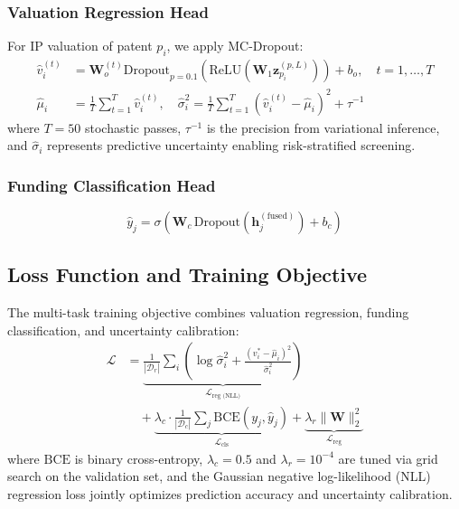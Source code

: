 \documentclass[journal]{IEEEtran}
\begin{document}
\subsubsection{Valuation Regression Head}

For IP valuation of patent $p_i$, we apply MC-Dropout:
\begin{align}
    \hat{v}_i^{(t)} &= \mathbf{W}_o^{(t)} \text{Dropout}_{p=0.1}(\text{ReLU}(\mathbf{W}_1 \mathbf{z}_{p_i}^{(p,L)})) + b_o, \quad t = 1,\ldots,T \label{eq:mc_fwd} \\
    \hat{\mu}_i &= \frac{1}{T}\sum_{t=1}^T \hat{v}_i^{(t)}, \quad \hat{\sigma}_i^2 = \frac{1}{T}\sum_{t=1}^T (\hat{v}_i^{(t)} - \hat{\mu}_i)^2 + \tau^{-1} \label{eq:mc_stats}
\end{align}
where $T=50$ stochastic passes, $\tau^{-1}$ is the precision from variational inference, and $\hat{\sigma}_i$ represents predictive uncertainty enabling risk-stratified screening.

\subsubsection{Funding Classification Head}

\begin{equation}
    \hat{y}_j = \sigma\!\left(\mathbf{W}_c \, \text{Dropout}(\mathbf{h}_j^{(\text{fused})}) + b_c\right)
    \label{eq:funding_head}
\end{equation}

\subsection{Loss Function and Training Objective}

The multi-task training objective combines valuation regression, funding classification, and uncertainty calibration:
\begin{align}
    \mathcal{L} &= \underbrace{\frac{1}{|\mathcal{D}_r|}\sum_i \left(\log \hat{\sigma}_i^2 + \frac{(v_i^* - \hat{\mu}_i)^2}{\hat{\sigma}_i^2}\right)}_{\mathcal{L}_{\text{reg (NLL)}}} \nonumber \\
    &\quad + \underbrace{\lambda_c \cdot \frac{1}{|\mathcal{D}_c|}\sum_j \text{BCE}(y_j, \hat{y}_j)}_{\mathcal{L}_{\text{cls}}} + \underbrace{\lambda_r \|\mathbf{W}\|_2^2}_{\mathcal{L}_{\text{reg}}}
    \label{eq:total_loss}
\end{align}
where $\text{BCE}$ is binary cross-entropy, $\lambda_c = 0.5$ and $\lambda_r = 10^{-4}$ are tuned via grid search on the validation set, and the Gaussian negative log-likelihood (NLL) regression loss jointly optimizes prediction accuracy and uncertainty calibration.
\end{document}
